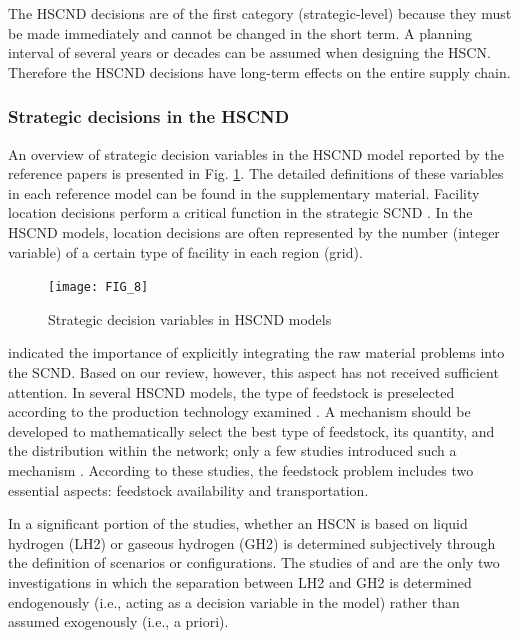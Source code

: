 \documentclass[11pt,3p]{elsarticle}
\begin{document}
The HSCND decisions are of the first category (strategic-level) because they must be made immediately \citep{klibi2010design} and cannot be changed in the short term. A planning interval of several years or decades can be assumed when designing the HSCN. Therefore the HSCND decisions have long-term effects on the entire supply chain.

\subsubsection{Strategic decisions in the HSCND}

An overview of strategic decision variables in the HSCND model reported by the reference papers is presented in Fig. \ref{fig:DecisionVariables}. The detailed definitions of these variables in each reference model can be found in the supplementary material. Facility location decisions perform a critical function in the strategic SCND \citep{melo2009facility}. In the HSCND models, location decisions are often represented by the number (integer variable) of a certain type of facility in each region (grid). 

\begin{figure}[!htbp]
\centering
\texttt{[image: FIG\_8]}
\caption{\label{fig:DecisionVariables}Strategic decision variables in HSCND models}
\end{figure}

\citet{melo2009facility} indicated the importance of explicitly integrating the raw material problems into the SCND. Based on our review, however, this aspect has not received sufficient attention. In several HSCND models, the type of feedstock is preselected according to the production technology examined \citep{almansoori2009design}. A mechanism should be developed to mathematically select the best type of feedstock, its quantity, and the distribution within the network; only a few studies introduced such a mechanism \citep{almansoori2009design,almansoori2012design,almaraz2014hydrogen,kim2017integrated,parker2010waste,woo2016optimization}. According to these studies, the feedstock problem includes two essential aspects: feedstock availability and transportation. 

In a significant portion of the studies, whether an HSCN is based on liquid hydrogen (LH2) or gaseous hydrogen (GH2) is determined subjectively through the definition of scenarios or configurations. The studies of \citet{agnolucci2013importance} and \citet{han2012modeling} are the only two investigations in which the separation between LH2 and GH2 is determined endogenously (i.e., acting as a decision variable in the model) rather than assumed exogenously (i.e., a priori). 
\end{document}
